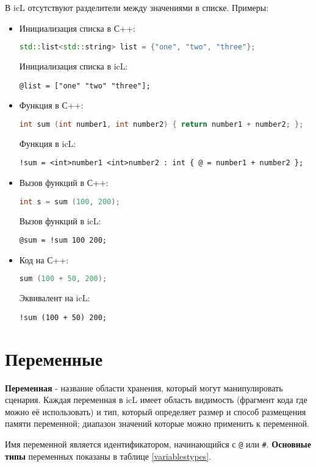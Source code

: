 \documentclass[a4paper, 14pt]{extarticle}
\newenvironment{icItems}
	{ \begin{itemize} [noitemsep,nolistsep] }
	{ \end{itemize} }
\begin{document}
	В icL отсутствуют разделители между значениями в списке. Примеры:
\begin{icItems}
  \item Инициализация списка в С++:
\begin{lstlisting}[numbers=none, language=C++]
std::list<std::string> list = {"one", "two", "three"};
\end{lstlisting}
	Инициализация списка в icL:
\begin{lstlisting}[numbers=none]
@list = ["one" "two" "three"];
\end{lstlisting}
  \item Функция в С++:
\begin{lstlisting}[numbers=none, language=C++]
int sum (int number1, int number2) { return number1 + number2; };
\end{lstlisting}
	Функция в icL:
\begin{lstlisting}[numbers=none]
!sum = <int>number1 <int>number2 : int { @ = number1 + number2 };
\end{lstlisting}
  \item Вызов функций в С++:
\begin{lstlisting}[numbers=none, language=C++]
int s = sum (100, 200);
\end{lstlisting}
	Вызов функций в icL:
\begin{lstlisting}[numbers=none]
@sum = !sum 100 200;
\end{lstlisting}
  \item Код на С++:
\begin{lstlisting}[numbers=none, language=C++]
sum (100 + 50, 200);
\end{lstlisting}
	Эквивалент на icL:
\begin{lstlisting}[numbers=none]
!sum (100 + 50) 200;
\end{lstlisting}
\end{icItems}

\newpage
\section{Переменные}  
	
	\textbf{Переменная} - название области хранения, который могут манипулировать сценария. Каждая переменная в icL имеет область видимость (фрагмент кода где можно её использовать) и тип, который определяет размер и способ размещения памяти переменной; диапазон значений которые можно применить к переменной.
	
	Имя переменной является идентификатором, начинающийся с \lstinline`@` или {\color{blue2}\lstinline`#`}.
	\textbf{Основные типы} переменных показаны в таблице \ref{variablestypes}.
\end{document}
